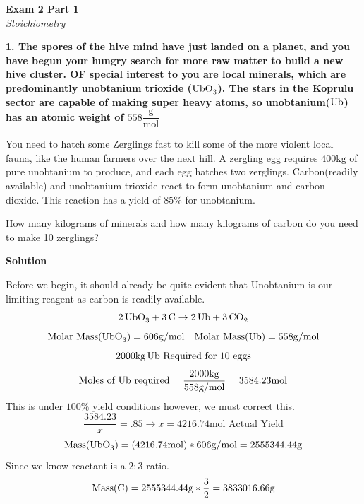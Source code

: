 \documentclass{article}
\begin{document}


    \begin{center}
        \textbf{Exam 2 Part 1}\\
        \textit{Stoichiometry}
    \end{center}
    \textbf{1. The spores of the hive mind have just landed on a planet, and you have begun your hungry search for more raw matter to build a new hive cluster. OF special interest to you are local minerals, which are predominantly unobtanium trioxide ($\ce{UbO_{3}}$). The stars in the Koprulu sector are capable of making super heavy atoms, so unobtanium($\ce{Ub}$) has an atomic weight of $558 \dfrac{\si{\gram}}{\si{\mol}}$}

    You need to hatch some Zerglings fast to kill some of the more violent local fauna, like the human farmers over the next hill. A zergling egg requires $400 \si{\kilo\gram}$ of pure unobtanium to produce, and each egg hatches two zerglings. Carbon(readily available) and unobtanium trioxide react to form unobtanium and carbon dioxide. This reaction has a yield of $85\%$ for unobtanium.

    How many kilograms of minerals and how many kilograms of carbon do you need to make 10 zerglings?

    \textbf{Solution}

    Before we begin, it should already be quite evident that Unobtanium is our limiting reagent as carbon is readily available.
    $$ \ce{2UbO3} + \ce{3C} \rightarrow \ce{2Ub} + \ce{3CO2}$$
    $$ \text{Molar Mass(\ce{UbO3})} = 606 \si[per-mode=symbol]{\gram\per\mole} \quad \text{Molar Mass(\ce{Ub})} = 558 \si[per-mode=symbol]{\gram\per\mole}  $$
    $$2000 \si{\kilo\gram} \, \ce{Ub} \text{ Required for 10 eggs} $$
    $$\text{Moles of \ce{Ub} required} = \dfrac{2000 \si{\kilo\gram}}{558 \si[per-mode=symbol]{\gram\per\mole}} = 3584.23 \si{\mole}$$
    This is under $100\%$ yield conditions however, we must correct this.
    $$\dfrac{3584.23}{x} = .85 \rightarrow x = 4216.74 \si{\mole} \text{ Actual Yield}$$
    $$\text{Mass(\ce{UbO3})} = (4216.74 \si{\mol}) * 606 \si[per-mode=symbol]{\gram\per\mole} = 2555344.44 \si{\gram} $$
    Since we know reactant is a $2:3$ ratio.
    $$\text{Mass(\ce{C})} = 2555344.44 \si{\gram} * \dfrac{3}{2} = 3833016.66 \si{\gram}$$
    \pagebreak
\end{document}
